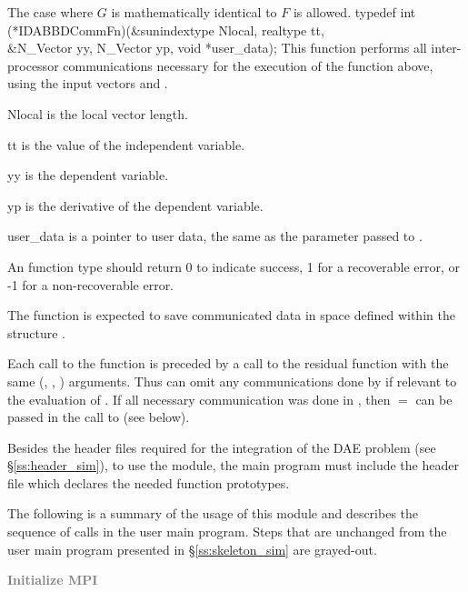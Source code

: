 {{  The case where $G$ is mathematically identical to $F$ is allowed.
}
{
  typedef int (*IDABBDCommFn)(&sunindextype Nlocal, realtype tt,  \\
                               &N\_Vector yy, N\_Vector yp, void *user\_data);
}
{
  This  function performs all inter-processor communications necessary
  for the execution of the  function above, using the input
  vectors  and .
}
{
  \begin{args}
  \item[Nlocal]
    is the local vector length.
  \item[tt]
    is the value of the independent variable.
  \item[yy]
    is the dependent variable.
  \item[yp]
    is the derivative of the dependent variable.
  \item[user\_data]
    is a pointer to user data, the same as the 
    parameter passed to .
  \end{args}
}
{
  An  function type should return 0 to indicate success,
  1 for a recoverable error, or -1 for a non-recoverable error.
}
{
  The  function is expected to save communicated data in space defined
  within the structure .

  Each call to the  function is preceded by a call to the residual
  function  with the same (, , ) arguments.
  Thus  can omit any communications done by  if relevant to the
  evaluation of .
  If all necessary communication was done in , then  $=$ 
  can be passed in the call to  (see below).

}


Besides the header files required for the integration of the DAE problem
(see \S\ref{ss:header_sim}),  to use the {\idabbdpre} module, the main program
must include the header file  which declares the needed
function prototypes.

The following is a summary of the usage of this module and describes the sequence
of calls in the user main program. Steps that are unchanged from the user main
program presented in \S\ref{ss:skeleton_sim} are grayed-out.
\begin{Steps}
\item
  \textcolor{gray}{\bf Initialize MPI}


\end{Steps}}
